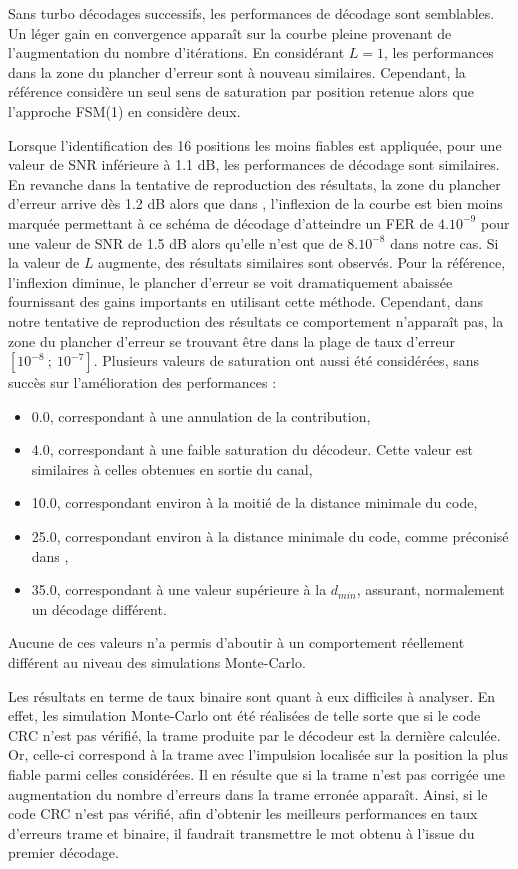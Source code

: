 Sans turbo décodages successifs, les performances de décodage sont semblables. Un léger gain en convergence apparaît 
sur  la courbe pleine provenant de l'augmentation du nombre d'itérations. En considérant $L=1$, les performances dans la
zone du plancher d'erreur sont à nouveau similaires. Cependant, la référence considère un seul sens de saturation par position
retenue alors que l'approche FSM(1) en considère deux. 

Lorsque l'identification des 16 positions les moins fiables est appliquée, pour une valeur de SNR inférieure à 1.1 dB, les 
performances de décodage sont similaires. En revanche dans la tentative de reproduction des résultats, la zone du plancher
d'erreur arrive dès 1.2 dB alors que dans \cite{cim}, l'inflexion de la courbe est bien moins marquée permettant à ce 
schéma de décodage d'atteindre un FER de $4.10^{-9}$ pour une valeur de SNR de 1.5 dB alors qu'elle n'est que de $8.10^{-8}$
dans notre cas. Si la valeur de $L$ augmente, des résultats similaires sont observés. Pour la référence, 
l'inflexion diminue, le plancher d'erreur se voit dramatiquement abaissée fournissant des gains importants en utilisant
cette méthode. Cependant, dans notre tentative de reproduction des résultats ce comportement n’apparaît pas, la zone du 
plancher d'erreur se trouvant être dans la plage de taux d'erreur $[10^{-8}~;~10^{-7}]$. Plusieurs valeurs de saturation 
ont aussi été considérées, sans succès sur l'amélioration des performances :
\begin{itemize}
	\item 0.0, correspondant à une annulation de la contribution, 
	\item 4.0, correspondant à une faible saturation du décodeur. Cette valeur est similaires à celles obtenues en sortie du canal,
	\item 10.0, correspondant environ à la moitié de la distance minimale du code,
	\item 25.0, correspondant environ à la distance minimale du code, comme préconisé dans \cite{cim, fsm},
	\item 35.0, correspondant à une valeur supérieure à la $d_{min}$, assurant, normalement un décodage différent.
\end{itemize}
Aucune de ces valeurs n'a permis d'aboutir à un comportement réellement différent au niveau des simulations Monte-Carlo.

Les résultats en terme de taux binaire sont quant à eux difficiles à analyser. En effet, les simulation Monte-Carlo 
ont été réalisées de telle sorte que si le code CRC n'est pas vérifié, la trame produite par le décodeur est la dernière calculée.
Or, celle-ci correspond à la trame avec l'impulsion localisée sur la position la plus fiable parmi celles considérées. 
Il en résulte que si la trame n'est pas corrigée une augmentation du nombre d'erreurs dans la trame erronée apparaît. Ainsi, 
si le code CRC n'est pas vérifié, afin d'obtenir les meilleurs performances en taux d'erreurs trame et binaire, il faudrait 
transmettre le mot obtenu à l'issue du premier décodage.

